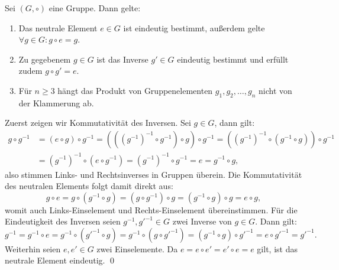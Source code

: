 \begin{übung}
Sei $(G, \circ)$ eine Gruppe. Dann gelte:
\begin{enumerate}
\item Das neutrale Element $e \in G$ ist eindeutig bestimmt, außerdem gelte $ \forall g \in G : g \circ e = g$.
\item Zu gegebenem $g \in G$ ist das Inverse $g' \in G$ eindeutig bestimmt und erfüllt zudem $g \circ g' = e$.
\item Für $n \geq 3$ hängt das Produkt von Gruppenelementen $g_1, g_2, \dots, g_n$ nicht von der Klammerung ab.
\end{enumerate}
\end{übung}

\begin{lösung}
Zuerst zeigen wir Kommutativität des Inversen. Sei $g \in G$, dann gilt:
\begin{align}
g \circ g^{-1} &= (e \circ g) \circ g^{-1} = \left( \left( \left( g^{-1}\right)^{-1} \circ g^{-1} \right) \circ g \right) \circ g^{-1} = \left(  \left( g^{-1}\right)^{-1} \circ \left( g^{-1} \circ g \right)\right) \circ g^{-1}\\ 
&= \left( g^{-1}\right)^{-1} \circ \left( e  \circ g^{-1} \right) = \left( g^{-1}\right)^{-1} \circ g^{-1} = e = g^{-1} \circ g,
\end{align}
also stimmen Links- und Rechtsinverses in Gruppen überein.
Die Kommutativität des neutralen Elements folgt damit direkt aus:
\begin{equation}
g \circ e = g \circ (g^{-1} \circ g) = (g \circ g^{-1}) \circ g = (g^{-1} \circ g) \circ g = e \circ g,
\end{equation}
womit auch Links-Einselement und Rechts-Einselement übereinstimmen.
Für die Eindeutigkeit des Inversen seien $g^{-1}, g'^{-1} \in G$ zwei Inverse von $g \in G$. Dann gilt:
\begin{equation}
g^{-1} = g^{-1} \circ e = g^{-1} \circ (g'^{-1} \circ g) = g^{-1} \circ (g \circ g'^{-1}) = (g^{-1} \circ g) \circ g'^{-1} = e \circ g'^{-1} = g'^{-1}.
\end{equation}
Weiterhin seien $e,e' \in G$ zwei Einselemente. Da $e = e \circ e' = e' \circ e = e$ gilt, ist das neutrale Element eindeutig. \qed
\end{lösung}

